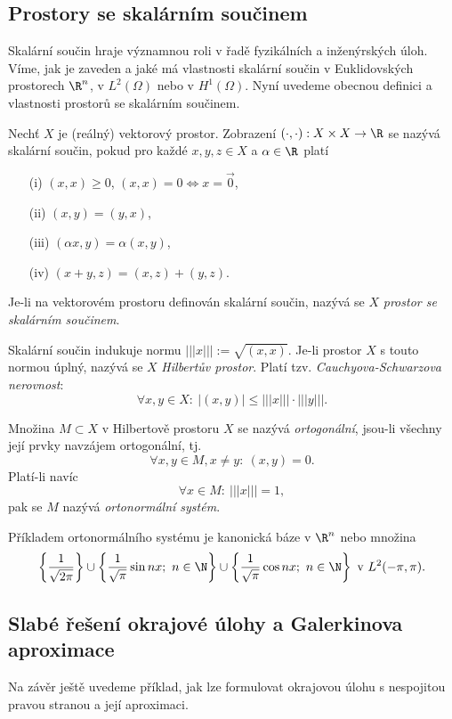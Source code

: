 \subsection{Prostory se skalárním součinem}

Skalární součin hraje významnou roli v řadě fyzikálních a inženýrských úloh.
Víme, jak je zaveden a jaké má vlastnosti skalární součin v Euklidovských prostorech $\R^n$, v $L^2(\Omega)$ nebo v $H^1(\Omega)$.
Nyní uvedeme obecnou definici a vlastnosti prostorů se skalárním součinem.
\begin{df}
Nechť $X$ je (reálný) vektorový prostor. Zobrazení $(\cdot,\cdot):X\times X\to\R$ se nazývá skalární součin, pokud pro každé $x,y,z\in X$ a $\alpha\in\R$ platí
\begin{itemize}
\item[(i)] $(x,x)\ge 0$, $(x,x)=0\Leftrightarrow x=\vec 0$,
\item[(ii)] $(x,y)=(y,x)$,
\item[(iii)] $(\alpha x,y)=\alpha(x,y)$,
\item[(iv)] $(x+y,z)=(x,z)+(y,z)$.
\end{itemize}
Je-li na vektorovém prostoru definován skalární součin, nazývá se $X$ \emph{prostor se skalárním součinem}.
\end{df}
Skalární součin indukuje normu $|||x|||:=\sqrt{(x,x)}$.
Je-li prostor $X$ s touto normou úplný, nazývá se $X$ \emph{Hilbertův prostor}.
Platí tzv. \emph{Cauchyova-Schwarzova nerovnost}:
\[ \forall x,y\in X: ~|(x,y)| \le |||x|||\cdot|||y|||. \]
\begin{df}
Množina $M\subset X$ v Hilbertově prostoru $X$ se nazývá \emph{ortogonální}, jsou-li všechny její prvky navzájem ortogonální, tj.
\[ \forall x,y\in M,x\neq y:~(x,y)=0. \]
Platí-li navíc
\[ \forall x\in M:~|||x|||=1, \]
pak se $M$ nazývá \emph{ortonormální systém}.
\end{df}
Příkladem ortonormálního systému je kanonická báze v $\R^n$ nebo množina
\[ \left\{\frac1{\sqrt{2\pi}}\right\}\cup\left\{\frac1{\sqrt\pi}\sin nx;~n\in\N\right\}\cup\left\{\frac1{\sqrt\pi}\cos nx;~n\in\N\right\} \mbox{ v }L^2(-\pi,\pi). \]



\subsection{Slabé řešení okrajové úlohy a Galerkinova aproximace}

Na závěr ještě uvedeme příklad, jak lze formulovat okrajovou úlohu s nespojitou pravou stranou a její aproximaci.

